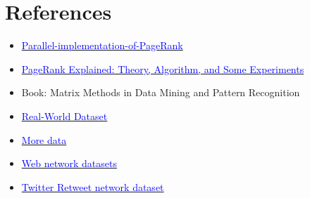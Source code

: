 \documentclass[a4paper]{article}
\begin{document}
\section{References}
\begin{itemize}
    \item \href{https://github.com/priyendumori/Parallel-implementation-of-PageRank}{\textcolor{blue}{Parallel-implementation-of-PageRank}}
    \item \href{https://hippocampus-garden.com/pagerank/#:~:text=The%20power%20method%20is%20a,M%20to%20any%20initial%20vector.}{\textcolor{blue}{PageRank Explained: Theory, Algorithm, and Some Experiments}}
    \item Book: Matrix Methods in Data Mining and Pattern Recognition
    \item \href{http://www.cs.cornell.edu/courses/cs685/2002fa/data/gr0.California}{\textcolor{blue}{Real-World Dataset}}
    \item \href{https://github.com/JiaoMaWHU/CudaPageRank/tree/master/data}{\textcolor{blue}{More data}}
    \item \href{http://networkrepository.com/web.php}{\textcolor{blue}{Web network datasets}}
    \item \href{http://networkrepository.com/rt-pol.php}{\textcolor{blue}{Twitter Retweet network dataset}}
\end{itemize}
\end{document}
